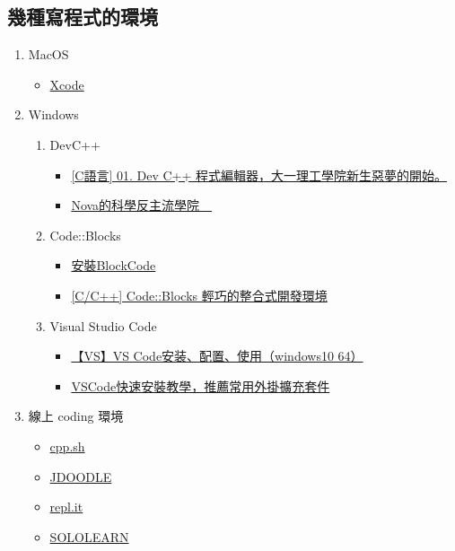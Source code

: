 \documentclass[a4paper,12pt]{article}
\begin{document}
\subsection{幾種寫程式的環境}
\label{sec:org5e50302}
\begin{enumerate}
\item MacOS
\label{sec:orga835070}
\begin{itemize}
\item \href{https://developer.apple.com/xcode/}{Xcode}\\
\end{itemize}
\item Windows
\label{sec:org338db69}
\begin{enumerate}
\item DevC++
\label{sec:org178034b}
\begin{itemize}
\item \href{https://progressbar.tw/posts/7}{[C語言] 01. Dev C++ 程式編輯器，大一理工學院新生惡夢的開始。}\\
\item \href{http://selfinquiring.hatenablog.com/entry/2016/03/18/204352}{Nova的科學反主流學院　}\\
\end{itemize}
\item Code::Blocks
\label{sec:org0c43f6f}
\begin{itemize}
\item \href{https://blog.csdn.net/DongChengRong/article/details/78624068}{安裝BlockCode}\\
\item \href{https://mks.tw/1053/cc-codeblocks-\%E8\%BC\%95\%E5\%B7\%A7\%E7\%9A\%84\%E6\%95\%B4\%E5\%90\%88\%E5\%BC\%8F\%E9\%96\%8B\%E7\%99\%BC\%E7\%92\%B0\%E5\%A2\%83}{[C/C++] Code::Blocks 輕巧的整合式開發環境}\\
\end{itemize}
\item Visual Studio Code
\label{sec:org9a30d95}
\begin{itemize}
\item \href{https://blog.csdn.net/HelloZEX/article/details/84029810}{【VS】VS Code安装、配置、使用（windows10 64）}\\
\item \href{https://tw.alphacamp.co/blog/visual-studio-code-editor-tutorial-and-extensions}{VSCode快速安裝教學，推薦常用外掛擴充套件}\\
\end{itemize}
\end{enumerate}
\item 線上 coding 環境
\label{sec:org19d8c2e}
\begin{itemize}
\item \href{http://cpp.sh/}{cpp.sh}\\
\item \href{https://www.jdoodle.com/online-compiler-c++/}{JDOODLE}\\
\item \href{https://repl.it/languages/cpp}{repl.it}\\
\item \href{https://code.sololearn.com/\#cpp}{SOLOLEARN}\\
\end{itemize}


\end{enumerate}
\end{document}
